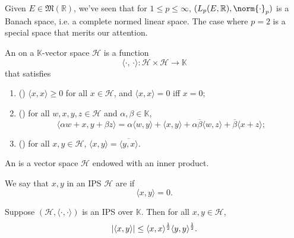 \documentclass[notoc,notitlepage]{tufte-book}
\begin{document}
Given $E \in \mathfrak{M}(\mathbb{R})$,
we've seen that for $1 \leq p \leq \infty$,
$(L_p(E, \mathbb{R}), \norm{\cdot}_p)$ is a Banach space, i.e.
a complete normed linear space.
The case where $p = 2$ is a special space that merits our attention.

\begin{defn}\label{defn:inner_product}
  An  on a $\mathbb{K}$-vector space
  $\mathcal{H}$ is a function
  \begin{equation*}
    \langle \cdot,\, \cdot \rangle : \mathcal{H} \times \mathcal{H} \to
    \mathbb{K}
  \end{equation*}
  that satisfies
  \begin{enumerate}
    \item () $\langle x, x \rangle \geq 0$
      for all $x \in \mathcal{H}$, and $\langle x, x \rangle = 0$ iff $x = 0$;
    \item () for all $w, x, y, z \in \mathcal{H}$ 
      and $\alpha, \beta \in \mathbb{K}$,
      \begin{equation*}
      \langle \alpha w + x, y + \beta z \rangle
      = \alpha \langle w, y \rangle
        + \langle x, y \rangle
        + \alpha \overline{\beta} \langle w, z \rangle
        + \overline{\beta} \langle x + z \rangle;
      \end{equation*}
    \item () for all $x, y \in \mathcal{H}$,
      $\langle x, y \rangle = \overline{\langle y, x \rangle}$.
  \end{enumerate}
\end{defn}

\begin{defn}\label{defn:inner_product_space}
  An  is a vector space $\mathcal{H}$ 
  endowed with an inner product.
\end{defn}

\begin{defn}[Orthogonality]\label{defn:orthogonality}
  We say that $x, y$ in an IPS $\mathcal{H}$ are 
  if
  \begin{equation*}
    \langle x, y \rangle = 0.
  \end{equation*}
\end{defn}

\begin{thm}\label{thm:cauchy_schwarz_inequality}
  Suppose $(\mathcal{H}, \langle \cdot, \cdot \rangle)$
  is an IPS over $\mathbb{K}$.
  Then for all $x, y \in \mathcal{H}$,
  \begin{equation*}
    \left|\langle x, y \rangle\right|
    \leq \langle x, x \rangle^{\frac{1}{2}} \langle y, y \rangle^{\frac{1}{2}}.
  \end{equation*}
\end{thm}
\end{document}
